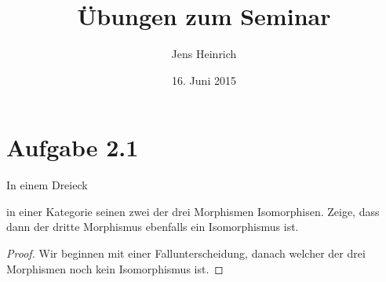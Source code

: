 \documentclass[xcolor=dvipsnames]{beamer}
\title{\"Ubungen zum Seminar \boldfont{Kategorientheorie} }
\author{Jens Heinrich}
\date{16. Juni 2015}
\begin{document}
 
	\maketitle
\section*{Aufgabe 2.1}
	In einem Dreieck 

	
	in einer Kategorie seinen zwei der drei Morphismen Isomorphisen.
	Zeige, dass dann der dritte Morphismus ebenfalls ein Isomorphismus ist.
	\begin{proof}
		Wir beginnen mit einer Fallunterscheidung, danach welcher der drei Morphismen noch kein Isomorphismus ist.
	\end{proof}
\end{document}
